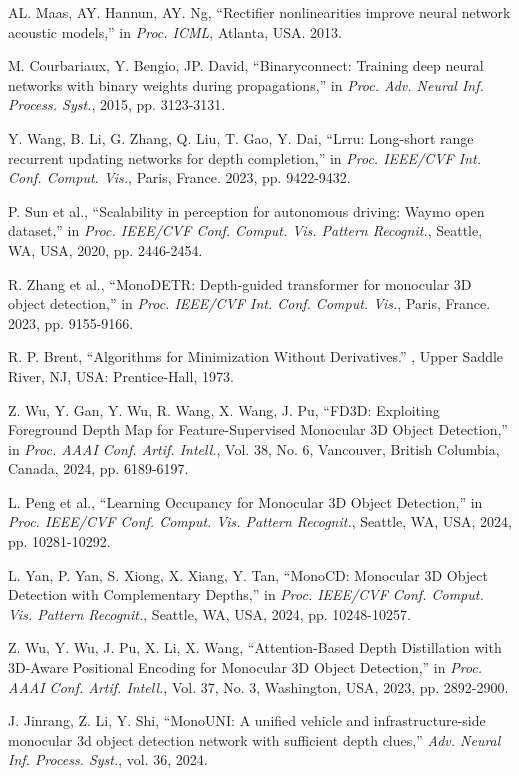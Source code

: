 \documentclass[journal]{IEEEtran}
\begin{document}
\begin{thebibliography}{1}
		AL. Maas, AY. Hannun, AY. Ng, “Rectifier nonlinearities improve neural network acoustic models,” in \textit{Proc. ICML}, 	Atlanta, USA. 2013. 
		
		M. Courbariaux, Y. Bengio, JP. David, “Binaryconnect: Training deep neural networks with binary weights during propagations,” in \textit{Proc. Adv. Neural Inf. Process. Syst.}, 2015, pp. 3123-3131.
		
		Y. Wang, B. Li, G. Zhang, Q. Liu, T. Gao, Y. Dai, “Lrru: Long-short range recurrent updating networks for depth completion,” in \textit{Proc. IEEE/CVF Int. Conf. Comput. Vis.}, Paris, France. 2023, pp. 9422-9432.
		
		P. Sun et al., “Scalability in perception for autonomous driving: Waymo open dataset,” in \textit{Proc. IEEE/CVF Conf. Comput. Vis. Pattern Recognit.}, Seattle, WA, USA, 2020, pp. 2446-2454.
		
		R. Zhang et al., “MonoDETR: Depth-guided transformer for monocular 3D object detection,” in \textit{Proc. IEEE/CVF Int. Conf. Comput. Vis.}, Paris, France. 2023, pp. 9155-9166.
		
		R. P. Brent, “Algorithms for Minimization Without Derivatives.” , Upper Saddle River, NJ, USA: Prentice-Hall, 1973.
		
		Z. Wu, Y. Gan, Y. Wu, R. Wang, X. Wang, J. Pu, “FD3D: Exploiting Foreground Depth Map for Feature-Supervised Monocular 3D Object Detection,” in \textit{Proc. AAAI Conf. Artif. Intell.}, Vol. 38, No. 6, Vancouver, British Columbia, Canada, 2024, pp. 6189-6197.
		
		L. Peng et al., “Learning Occupancy for Monocular 3D Object Detection,” in \textit{Proc. IEEE/CVF Conf. Comput. Vis. Pattern Recognit.}, Seattle, WA, USA, 2024, pp. 10281-10292.
		
		L. Yan, P. Yan, S. Xiong, X. Xiang, Y. Tan, “MonoCD: Monocular 3D Object Detection with Complementary Depths,” in \textit{Proc. IEEE/CVF Conf. Comput. Vis. Pattern Recognit.}, Seattle, WA, USA, 2024, pp. 10248-10257.
		
		Z. Wu, Y. Wu, J. Pu, X. Li, X. Wang, “Attention-Based Depth Distillation with 3D-Aware Positional Encoding for Monocular 3D Object Detection,” in \textit{Proc. AAAI Conf. Artif. Intell.}, Vol. 37, No. 3, Washington, USA, 2023, pp. 2892-2900.
		
		J. Jinrang, Z. Li, Y. Shi, “MonoUNI: A unified vehicle and infrastructure-side monocular 3d object detection network with sufficient depth clues,” \textit{Adv. Neural Inf. Process. Syst.}, vol. 36, 2024.
		

\end{thebibliography}
\end{document}
